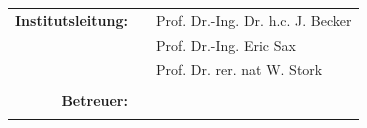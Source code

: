 \begin{titlepage}
\begin{minipage}{15cm}
\begin{center}
\vspace{1cm}
\Large
\textbf{\abgabe}
\end{center}
%
\vspace{2.5cm}

\begin{tabular}{rcl}
\bfseries Institutsleitung: 
&& Prof. Dr.-Ing. Dr. h.c. J. Becker\\
&& Prof. Dr.-Ing. Eric Sax\\
&& Prof. Dr. rer. nat  W. Stork\\

 \\
	\bfseries Betreuer:       &&\nameprefix  \betreuerA \\
											      && \betreuerB \\
\end{tabular}											
\end{minipage}
\end{titlepage}